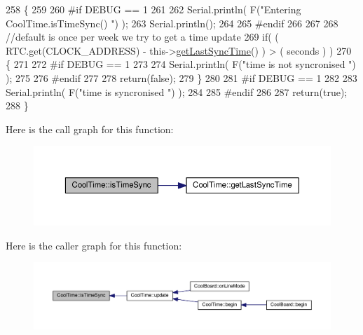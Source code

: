 \begin{DoxyCode}
258 \{
259 
260 \textcolor{preprocessor}{#if DEBUG == 1}
261 
262     Serial.println( F(\textcolor{stringliteral}{"Entering CoolTime.isTimeSync() "}) );
263     Serial.println();
264 
265 \textcolor{preprocessor}{#endif }
266 
267 
268     \textcolor{comment}{//default is once per week we try to get a time update}
269     \textcolor{keywordflow}{if}( ( RTC.get(CLOCK\_ADDRESS) - this->\hyperlink{classCoolTime_a5d17f707a9d337720493b2bce9d41c21}{getLastSyncTime}() ) > ( seconds ) ) 
270     \{
271 
272 \textcolor{preprocessor}{    #if DEBUG == 1 }
273 
274         Serial.println( F(\textcolor{stringliteral}{"time is not syncronised "}) );
275     
276 \textcolor{preprocessor}{    #endif}
277 
278         \textcolor{keywordflow}{return}(\textcolor{keyword}{false});  
279     \}
280     
281 \textcolor{preprocessor}{#if DEBUG == 1 }
282 
283     Serial.println( F(\textcolor{stringliteral}{"time is syncronised "}) );
284 
285 \textcolor{preprocessor}{#endif }
286 
287     \textcolor{keywordflow}{return}(\textcolor{keyword}{true});
288 \}
\end{DoxyCode}
Here is the call graph for this function\+:
\nopagebreak
\begin{figure}[H]
\begin{center}
\leavevmode
\includegraphics[width=350pt]{classCoolTime_a5ae038a4498602b189f76a10bf02adf8_cgraph}
\end{center}
\end{figure}
Here is the caller graph for this function\+:
\nopagebreak
\begin{figure}[H]
\begin{center}
\leavevmode
\includegraphics[width=350pt]{classCoolTime_a5ae038a4498602b189f76a10bf02adf8_icgraph}
\end{center}
\end{figure}
\mbox{\label{classCoolTime_af355e7f9b3898211cd2ff25eab5933b1}} 
